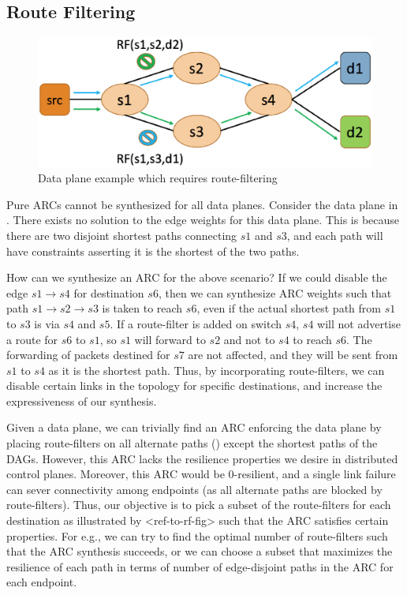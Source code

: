 \subsection{Route Filtering} \label{sec:routefilter}
\begin{figure}[h!] 
	\centering
	\includegraphics[width=0.8\columnwidth]{figures/diamond.eps}
	\caption{Data plane example which requires route-filtering} \label{fig:diamond}
\end{figure}
Pure ARCs cannot be synthesized for all data planes. Consider the data
plane in . 
There exists no solution to the edge weights for this data plane. This is because 
there are two disjoint shortest paths connecting $s1$ and $s3$, and each path will have 
constraints
asserting it is the shortest of the two paths. 

How can we synthesize an ARC for the above scenario? 
If we could disable the edge
$s1 \rightarrow s4$ for destination $s6$, then we can synthesize ARC weights
such that path $s1 \rightarrow s2 \rightarrow s3$ is taken to reach $s6$, 
even if the actual shortest path
from $s1$ to $s3$ is via $s4$ and $s5$. 
If a route-filter is added on switch $s4$, $s4$ 
will not advertise a route for $s6$ to $s1$, so 
$s1$ will forward to $s2$ and not to $s4$
to reach $s6$. The forwarding of packets destined
for $s7$ are not affected, and they will be sent from
$s1$ to $s4$ as it is the shortest path.
Thus, by incorporating route-filters, we can
disable certain links in the topology 
for specific destinations, and increase the 
expressiveness of our synthesis. 

Given a data plane, we can trivially find an 
ARC enforcing the data plane by placing 
route-filters on all alternate paths ()%
except the shortest paths of the DAGs. However, this
ARC lacks the resilience properties we desire in
distributed control planes. Moreover, this ARC would be
0-resilient, and a single link failure can sever 
connectivity among endpoints (as all alternate paths
are blocked by route-filters). Thus, our objective is
to pick a subset of the route-filters for each destination
as illustrated by <ref-to-rf-fig> such that the 
ARC satisfies certain properties. For e.g., we can
try to find the optimal number of route-filters such 
that the ARC synthesis succeeds, or we can choose a
subset that maximizes the resilience of each path 
in terms of number of edge-disjoint paths in the ARC
for each endpoint. 

